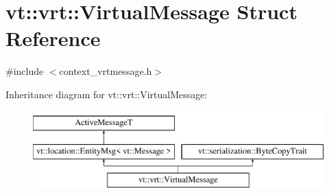 \hypertarget{structvt_1_1vrt_1_1_virtual_message}{}\section{vt\+:\+:vrt\+:\+:Virtual\+Message Struct Reference}
\label{structvt_1_1vrt_1_1_virtual_message}


{\ttfamily \#include $<$context\+\_\+vrtmessage.\+h$>$}

Inheritance diagram for vt\+:\+:vrt\+:\+:Virtual\+Message\+:\begin{figure}[H]
\begin{center}
\leavevmode
\includegraphics[height=3.000000cm]{structvt_1_1vrt_1_1_virtual_message}
\end{center}
\end{figure}
